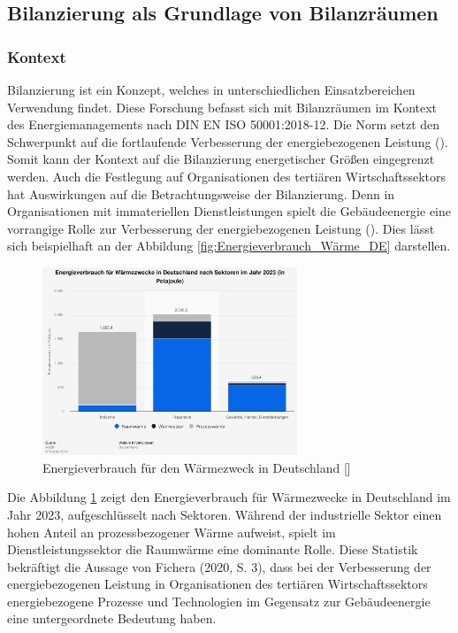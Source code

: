 \subsection{Bilanzierung als Grundlage von Bilanzräumen}

\subsubsection{Kontext}

Bilanzierung ist ein Konzept, welches in unterschiedlichen Einsatzbereichen Verwendung findet. Diese Forschung befasst sich mit Bilanzräumen im Kontext des 
Energiemanagements nach DIN EN ISO 50001:2018-12. Die Norm setzt den Schwerpunkt auf die fortlaufende Verbesserung der energiebezogenen Leistung 
(\cite[Kapitel 0.2]{DIN50001.2018}). Somit kann der Kontext auf die Bilanzierung energetischer Größen eingegrenzt werden.
Auch die Festlegung auf Organisationen des tertiären Wirtschaftssektors hat Auswirkungen auf die Betrachtungsweise der Bilanzierung. Denn in Organisationen 
mit immateriellen Dienstleistungen spielt die Gebäudeenergie eine vorrangige Rolle zur Verbesserung der energiebezogenen Leistung (\cite[S. 3]{Fichera.2020}).
Dies lässt sich beispielhaft an der Abbildung \eqref{fig:Energieverbrauch_Wärme_DE} darstellen.

\begin{figure}[H]
    \centering
    \includegraphics[width=0.68\textwidth]{../../Ressourcen/Abbildungen/Energieverbrauch_für_Wärmezweck_DE.jpg}
    \caption{Energieverbrauch für den Wärmezweck in Deutschland [\cite{AGEB.2024}]}
    \label{fig:Energieverbrauch_Wärme_DE}
\end{figure}

Die Abbildung \ref{fig:Energieverbrauch_Wärme_DE} zeigt den Energieverbrauch für Wärmezwecke in Deutschland im Jahr 2023, aufgeschlüsselt nach Sektoren. 
Während der industrielle Sektor einen hohen Anteil an prozessbezogener Wärme aufweist, 
spielt im Dienstleistungssektor die Raumwärme eine dominante Rolle.
Diese Statistik bekräftigt die Aussage von Fichera (2020, S. 3), dass bei der Verbesserung der energiebezogenen Leistung in Organisationen des tertiären 
Wirtschaftssektors energiebezogene Prozesse und Technologien im Gegensatz zur Gebäudeenergie eine untergeordnete Bedeutung haben.

